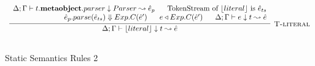 \begin{figure}
\[\begin{array}{c}
\infer[\textsc{T-literal}]
	  {\Delta; \Gamma \vdash \lfloor literal \rfloor \downarrow t \leadsto \hat{e} }
	  {\renewcommand{\arraystretch}{1}
	    \begin{array}{r}
	    \Delta;\Gamma \vdash t.\keyw{metaobject}.parser\downarrow Parser \leadsto \hat{e}_p ~~~~~ \text{TokenStream of~} \lfloor literal \rfloor\ \text{is}\ \hat{e}_{ts}\\
            \hat{e}_p.parse(\hat{e}_{ts}) \Downarrow Exp.C(\hat{e}') ~~~~~  e \triangleleft Exp.C(\hat{e}')~~~~~ \Delta;\Gamma\vdash e\downarrow t \leadsto \hat{e}
            \end{array}
       } \\[3ex]   
\end{array}
\]
\caption{Static Semantics Rules 2}
\end{figure}




